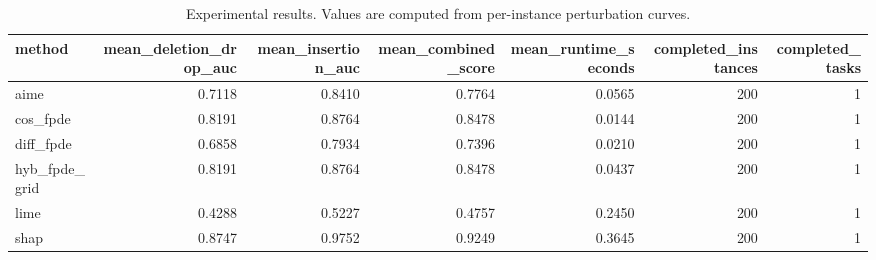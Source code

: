 \begin{table}[t]
\caption{Experimental results. Values are computed from per-instance perturbation curves.}
\label{tab:main_results_computed}
\centering
\begin{tabular}{lrrrrrr}
\toprule
method & mean\_deletion\_drop\_auc & mean\_insertion\_auc & mean\_combined\_score & mean\_runtime\_seconds & completed\_instances & completed\_tasks \\
\midrule
aime & 0.7118 & 0.8410 & 0.7764 & 0.0565 & 200 & 1 \\
cos\_fpde & 0.8191 & 0.8764 & 0.8478 & 0.0144 & 200 & 1 \\
diff\_fpde & 0.6858 & 0.7934 & 0.7396 & 0.0210 & 200 & 1 \\
hyb\_fpde\_grid & 0.8191 & 0.8764 & 0.8478 & 0.0437 & 200 & 1 \\
lime & 0.4288 & 0.5227 & 0.4757 & 0.2450 & 200 & 1 \\
shap & 0.8747 & 0.9752 & 0.9249 & 0.3645 & 200 & 1 \\
\bottomrule
\end{tabular}

\end{table}
